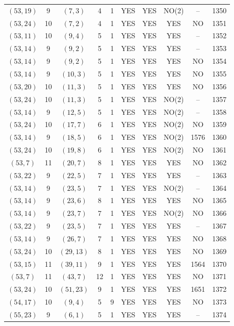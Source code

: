 \begin{longtable}{|c|c|c|c|c|c|c|c|c|c|}
$(53, 19)$ & 9 & $(7, 3)$ & 4 & 1 & YES & YES & NO(2) & -- & 1350\\
$(53, 24)$ & 10 & $(7, 2)$ & 4 & 1 & YES & YES & YES & NO & 1351\\
$(53, 11)$ & 10 & $(9, 4)$ & 5 & 1 & YES & YES & YES & -- & 1352\\
$(53, 14)$ & 9 & $(9, 2)$ & 5 & 1 & YES & YES & YES & -- & 1353\\
$(53, 14)$ & 9 & $(9, 2)$ & 5 & 1 & YES & YES & YES & NO & 1354\\
$(53, 14)$ & 9 & $(10, 3)$ & 5 & 1 & YES & YES & YES & NO & 1355\\
$(53, 20)$ & 10 & $(11, 3)$ & 5 & 1 & YES & YES & YES & NO & 1356\\
$(53, 24)$ & 10 & $(11, 3)$ & 5 & 1 & YES & YES & NO(2) & -- & 1357\\
$(53, 14)$ & 9 & $(12, 5)$ & 5 & 1 & YES & YES & NO(2) & -- & 1358\\
$(53, 24)$ & 10 & $(17, 7)$ & 6 & 1 & YES & YES & NO(2) & NO & 1359\\
$(53, 14)$ & 9 & $(18, 5)$ & 6 & 1 & YES & YES & NO(2) & 1576 & 1360\\
$(53, 24)$ & 10 & $(19, 8)$ & 6 & 1 & YES & YES & NO(2) & NO & 1361\\
$(53, 7)$ & 11 & $(20, 7)$ & 8 & 1 & YES & YES & YES & NO & 1362\\
$(53, 22)$ & 9 & $(22, 5)$ & 7 & 1 & YES & YES & YES & -- & 1363\\
$(53, 14)$ & 9 & $(23, 5)$ & 7 & 1 & YES & YES & NO(2) & -- & 1364\\
$(53, 14)$ & 9 & $(23, 6)$ & 8 & 1 & YES & YES & YES & NO & 1365\\
$(53, 14)$ & 9 & $(23, 7)$ & 7 & 1 & YES & YES & NO(2) & NO & 1366\\
$(53, 22)$ & 9 & $(23, 5)$ & 7 & 1 & YES & YES & YES & -- & 1367\\
$(53, 14)$ & 9 & $(26, 7)$ & 7 & 1 & YES & YES & YES & NO & 1368\\
$(53, 24)$ & 10 & $(29, 13)$ & 8 & 1 & YES & YES & YES & NO & 1369\\
$(53, 15)$ & 11 & $(39, 11)$ & 9 & 1 & YES & YES & YES & 1564 & 1370\\
$(53, 7)$ & 11 & $(43, 7)$ & 12 & 1 & YES & YES & YES & NO & 1371\\
$(53, 24)$ & 10 & $(51, 23)$ & 9 & 1 & YES & YES & YES & 1651 & 1372\\
$(54, 17)$ & 10 & $(9, 4)$ & 5 & 9 & YES & YES & YES & NO & 1373\\
$(55, 23)$ & 9 & $(6, 1)$ & 5 & 1 & YES & YES & YES & -- & 1374\\

\end{longtable}
